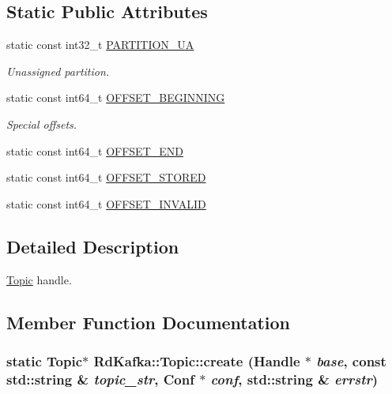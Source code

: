 \subsection*{Static Public Attributes}
\begin{DoxyCompactItemize}
\item 
static const int32\_\-t \hyperlink{classRdKafka_1_1Topic_ab69c18779df1c8e150648e640b159654}{PARTITION\_\-UA}
\begin{DoxyCompactList}\small\item\em Unassigned partition. \item\end{DoxyCompactList}\item 
static const int64\_\-t \hyperlink{classRdKafka_1_1Topic_a5d3aa07897b2a84dd23aa501318be42a}{OFFSET\_\-BEGINNING}
\begin{DoxyCompactList}\small\item\em Special offsets. \item\end{DoxyCompactList}\item 
static const int64\_\-t \hyperlink{classRdKafka_1_1Topic_ac13c22ede4c3475282e3bd80a4fa969f}{OFFSET\_\-END}
\item 
static const int64\_\-t \hyperlink{classRdKafka_1_1Topic_a94be7a8729b679e1065910acd0cd7fff}{OFFSET\_\-STORED}
\item 
static const int64\_\-t \hyperlink{classRdKafka_1_1Topic_a01bf1a7bec9ce67de81239d81722237b}{OFFSET\_\-INVALID}
\end{DoxyCompactItemize}


\subsection{Detailed Description}
\hyperlink{classRdKafka_1_1Topic}{Topic} handle. 

\subsection{Member Function Documentation}
\hypertarget{classRdKafka_1_1Topic_a01b26449715177b98a3f7edaf42d75a7}{
\subsubsection[{create}]{\setlength{\rightskip}{0pt plus 5cm}static {\bf Topic}$\ast$ RdKafka::Topic::create ({\bf Handle} $\ast$ {\em base}, \/  const std::string \& {\em topic\_\-str}, \/  {\bf Conf} $\ast$ {\em conf}, \/  std::string \& {\em errstr})}}
\label{classRdKafka_1_1Topic_a01b26449715177b98a3f7edaf42d75a7}


